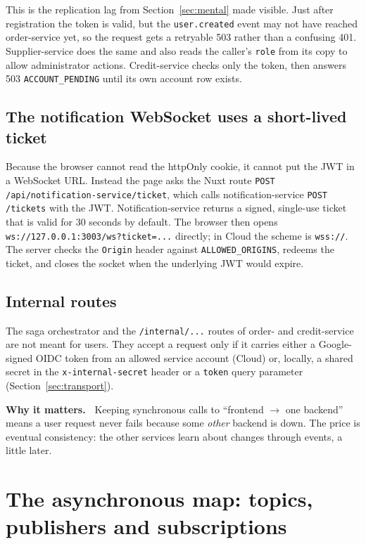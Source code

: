 \documentclass[11pt,a4paper]{article}
\newcommand{\code}[1]{\nolinkurl{#1}}
\newenvironment{why}{%
  \def\FrameCommand{{\color{accent}\vrule width 2.5pt}\hspace{8pt}}%
  \MakeFramed{\advance\hsize-\width\FrameRestore}\noindent\textbf{Why it matters.\ }}%
  {\endMakeFramed}
\begin{document}
This is the replication lag from Section~\ref{sec:mental} made visible. Just after
registration the token is valid, but the \code{user.created} event may not have reached
order-service yet, so the request gets a retryable 503 rather than a confusing 401.
Supplier-service does the same and also reads the caller's \code{role} from its copy to
allow administrator actions. Credit-service checks only the token, then answers 503
\code{ACCOUNT_PENDING} until its own account row exists.

\subsection{The notification WebSocket uses a short-lived ticket}

Because the browser cannot read the httpOnly cookie, it cannot put the JWT in a
WebSocket URL. Instead the page asks the Nuxt route
\code{POST /api/notification-service/ticket}, which calls notification-service
\code{POST /tickets} with the JWT. Notification-service returns a signed, single-use
ticket that is valid for 30 seconds by default. The browser then opens
\code{ws://127.0.0.1:3003/ws?ticket=...} directly; in Cloud the scheme is
\code{wss://}. The server checks the \code{Origin} header against
\code{ALLOWED_ORIGINS}, redeems the ticket, and closes the socket when the underlying JWT
would expire.

\subsection{Internal routes}

The saga orchestrator and the \code{/internal/...} routes of order- and credit-service
are not meant for users. They accept a request only if it carries either a Google-signed
OIDC token from an allowed service account (Cloud) or, locally, a shared secret in the
\code{x-internal-secret} header or a \code{token} query parameter
(Section~\ref{sec:transport}).

\begin{why}
Keeping synchronous calls to ``frontend $\rightarrow$ one backend'' means a user request
never fails because some \emph{other} backend is down. The price is eventual
consistency: the other services learn about changes through events, a little later.
\end{why}

\section{The asynchronous map: topics, publishers and subscriptions}
\label{sec:topics}
\end{document}
